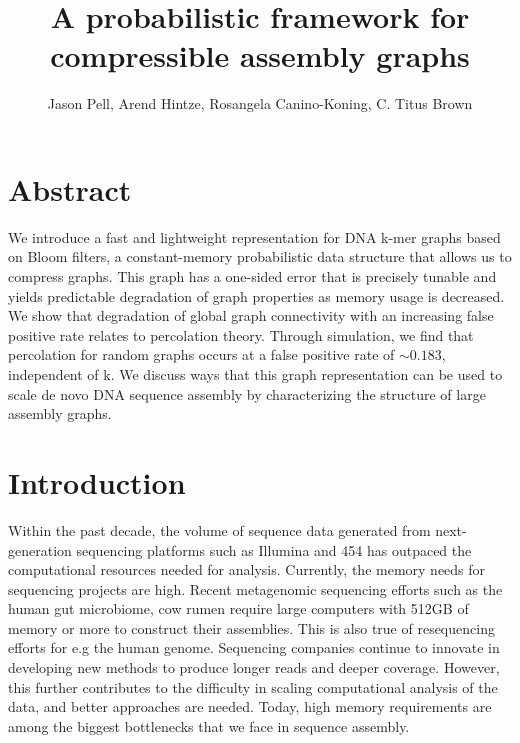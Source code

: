 \documentclass[12pt]{article} \usepackage{simplemargins}
\begin{document}
\title{A probabilistic framework for compressible assembly graphs}
\author{Jason Pell, Arend Hintze, Rosangela Canino-Koning, C. Titus Brown}

\maketitle

\section{Abstract}

We introduce a fast and lightweight representation for DNA k-mer graphs
based on Bloom filters, a constant-memory probabilistic data structure that allows us
to compress graphs.  This graph has a one-sided
error that is precisely tunable and yields predictable degradation of
graph properties as memory usage is decreased. We show that degradation of global graph connectivity with an increasing false
positive rate relates to percolation theory. Through 
simulation, we find that percolation for random graphs occurs at a false positive rate 
of $\sim 0.183$, independent of k. We discuss ways that this
graph representation can be used to scale de novo DNA sequence assembly by characterizing the structure of
large assembly graphs.

\section{Introduction}

Within the past decade, the volume of sequence data generated
from next-generation sequencing platforms such as Illumina and 454
has outpaced the computational resources needed for
analysis. Currently, the memory needs for sequencing projects 
are high. Recent metagenomic sequencing efforts such as the human gut
microbiome\cite{pmid20203603}, cow rumen\cite{pmid21273488}
require large computers with 512GB of memory
or more to construct their assemblies.  This is also true of resequencing
efforts for e.g the human genome\cite{pmid21187386}.
Sequencing companies continue to innovate in developing new 
methods to produce longer reads
and deeper coverage. However, this further contributes 
to the difficulty in scaling computational 
analysis of the data, and better approaches are needed.
Today, high memory requirements are
among the biggest bottlenecks that we face in sequence assembly.
\end{document}
